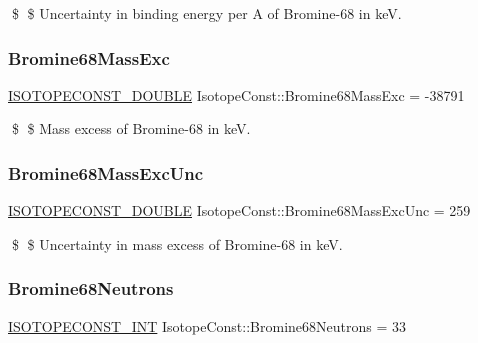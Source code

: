 \$ \$ Uncertainty in binding energy per A of Bromine-\/68 in keV. \mbox{\label{group___isotope_const-_bromine-_br68_ga7d7f0cf35d71612f90b149ca49fb7c3b}} 
\subsubsection{\texorpdfstring{Bromine68\+Mass\+Exc}{Bromine68MassExc}}
{\footnotesize\ttfamily \mbox{\hyperlink{group___isotope_const-_macros_ga8f45a7272ce02c0b4c65c44636ed719a}{I\+S\+O\+T\+O\+P\+E\+C\+O\+N\+S\+T\+\_\+\+D\+O\+U\+B\+LE}} Isotope\+Const\+::\+Bromine68\+Mass\+Exc = -\/38791}

\$ \$ Mass excess of Bromine-\/68 in keV. \mbox{\label{group___isotope_const-_bromine-_br68_gaf872da8499ba23f99b8ec7bd8a57a5cf}} 
\subsubsection{\texorpdfstring{Bromine68\+Mass\+Exc\+Unc}{Bromine68MassExcUnc}}
{\footnotesize\ttfamily \mbox{\hyperlink{group___isotope_const-_macros_ga8f45a7272ce02c0b4c65c44636ed719a}{I\+S\+O\+T\+O\+P\+E\+C\+O\+N\+S\+T\+\_\+\+D\+O\+U\+B\+LE}} Isotope\+Const\+::\+Bromine68\+Mass\+Exc\+Unc = 259}

\$ \$ Uncertainty in mass excess of Bromine-\/68 in keV. \mbox{\label{group___isotope_const-_bromine-_br68_ga821b6d816fe45c8f7dfff54d8302ab36}} 
\subsubsection{\texorpdfstring{Bromine68\+Neutrons}{Bromine68Neutrons}}
{\footnotesize\ttfamily \mbox{\hyperlink{group___isotope_const-_macros_ga5f18360b3e99483a35c32d789e62621c}{I\+S\+O\+T\+O\+P\+E\+C\+O\+N\+S\+T\+\_\+\+I\+NT}} Isotope\+Const\+::\+Bromine68\+Neutrons = 33}

